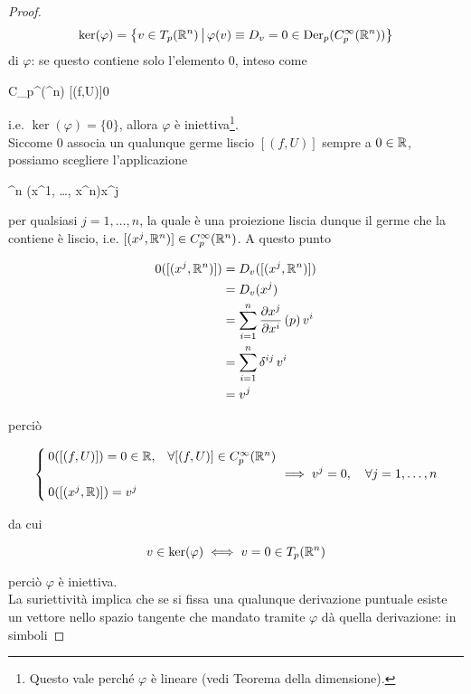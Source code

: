 \begin{proof}
{		\begin{equation*}
			\ker(\varphi) = \left\{ v \in T_{p}(\mathbb{R}^{n}) \, \middle| \, \varphi(v) \equiv D_{v} = 0 \in \operatorname{Der}_{p}(C_{p}^{\infty}(\mathbb{R}^{n})) \right\}
		\end{equation*}%
	} di $ \varphi $: se questo contiene solo l'elemento $ 0 $, inteso come
	
		{C_{p}^{\infty}(\R^{n})}{\R}
		{[(f,U)]}{0}

	i.e. $ \ker(\varphi) = \{0\} $, allora $ \varphi $ è iniettiva\footnote{
		Questo vale perché $ \varphi $ è lineare (vedi Teorema della dimensione).%
	}. \\
	Siccome $ 0 $ associa un qualunque germe liscio $ [(f,U)] $ sempre a $ 0 \in \mathbb{R} $, possiamo scegliere l'applicazione
	
		{\R^{n}}{\R}
		{(x^{1}, \dots, x^{n})}{x^{j}}

	per qualsiasi $ j=1,\dots,n $, la quale è una proiezione liscia dunque il germe che la contiene è liscio, i.e. $ [(x^{j},\mathbb{R}^{n})] \in C_{p}^{\infty}(\mathbb{R}^{n}) $. A questo punto
	
	\begin{align}
		\begin{split}
			0([(x^{j},\mathbb{R}^{n})]) &= D_{v} ([(x^{j},\mathbb{R}^{n})]) \\
			&= D_{v} (x^{j}) \\
			&= \sum_{i=1}^{n} \pdv{x^{j}}{x^{i}} \, (p) \, v^{i} \\
			&= \sum_{i=1}^{n} \delta^{ij} \, v^{i} \\
			&= v^{j}
		\end{split}
	\end{align}

	perciò
	
	\begin{equation}
		\begin{cases}
			0([(f,U)]) = 0 \in \R, & \forall [(f,U)] \in C_{p}^{\infty}(\R^{n}) \\ \\
			0([(x^{j},\R)]) = v^{j}
		\end{cases} %
		 \implies v^{j} = 0 \qcomma \forall j=1,\dots,n
	\end{equation}
	
	da cui
	
	\begin{equation}
		v \in \ker(\varphi) \iff v = 0 \in T_{p}(\mathbb{R}^{n})
	\end{equation}
	
	perciò $ \varphi $ è iniettiva. \\
	La suriettività implica che se si fissa una qualunque derivazione puntuale esiste un vettore nello spazio tangente che mandato tramite $ \varphi $ dà quella derivazione: in simboli


\end{proof}
